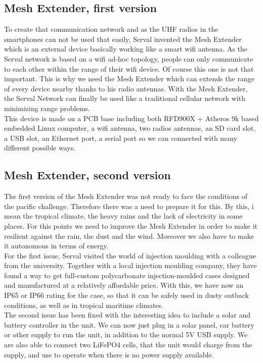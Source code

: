 \subsection{Mesh Extender, first version}
To create that communication network and as the UHF radios in the smartphones can not be used that easily, Serval invented the Mesh Extender which is an external device basically working like a smart wifi antenna. As the Serval network is based on a wifi ad-hoc topology, people can only communicate to each other within the range of their wifi device. Of course this one is not that important. This is why we need the Mesh Extender which can extends the range of every device nearby thanks to his radio antennas. With the Mesh Extender, the Serval Network can finally be used like a traditional cellular network with minimizing range problems. \\
This device is made on a PCB base including both RFD900X + Atheros 9k based embedded Linux computer, a wifi antenna, two radios antennas, an SD card slot, a USB slot, an Ethernet port, a serial port so we can connected with many different possible ways.

\subsection{Mesh Extender, second version}
The first version of the Mesh Extender was not ready to face the conditions of the pacific challenge. Therefore there was a need to prepare it for this. By this, i mean the tropical climate, the heavy rains and the lack of electricity in some places. For this points we need to improve the Mesh Extender in order to make it resilient against the rain, the dust and the wind. Moreover we also have to make it autonomous in terms of energy. \\
For the first issue, Serval visited the world of injection moulding with a colleague from the university. Together with a local injection moulding company, they have found a way to get full-custom polycarbonate injection-moulded cases designed and manufactured at a relatively affordable price. With this, we have now an IP65 or IP66 rating for the case, so that it can be safely used in dusty outback conditions, as well as in tropical maritime climates.\\
The second issue has been fixed with the interesting idea to include a solar and battery controller in the unit. We can now just plug in a solar panel, car battery or other supply to run the unit, in addition to the normal 5V USB supply.  We are also able to connect two LiFePO4 cells, that the unit would charge from the supply, and use to operate when there is no power supply available. 